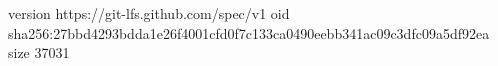 version https://git-lfs.github.com/spec/v1
oid sha256:27bbd4293bdda1e26f4001cfd0f7c133ca0490eebb341ac09c3dfc09a5df92ea
size 37031
